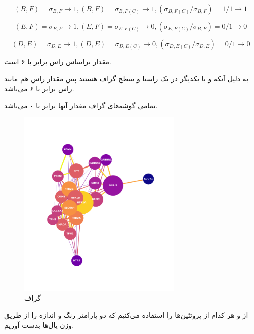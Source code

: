 \documentclass[10pt, a4paper]{article}
\begin{document}
\begin{equation}
(B,F) = \sigma_{B,F} \rightarrow 1, (B,F) = \sigma_{B,F(C)} \rightarrow 1, (\sigma_{B,F(C)}/\sigma_{B,F}) = 1/1 \rightarrow 1
\end{equation}

\begin{equation}
(E,F) = \sigma_{E,F} \rightarrow 1, (E,F) = \sigma_{E,F(C)} \rightarrow 0, (\sigma_{E,F(C)}/\sigma_{B,F}) = 0/1 \rightarrow 0
\end{equation}

\begin{equation}
(D,E) = \sigma_{D,E} \rightarrow 1, (D,E) = \sigma_{D,E(C)} \rightarrow 0, (\sigma_{D,E(C)}/\sigma_{D,E}) = 0/1 \rightarrow 0
\end{equation}

مقدار  براساس راس  برابر با ۶ است.

به دلیل آنکه  و  با یکدیگر در یک راستا و سطح گراف هستند پس مقدار راس
 هم مانند راس  برابر با ۶ می‌باشد.

تمامی گوشه‌های گراف مقدار  آنها برابر با ۰ می‌باشد.

\begin{figure}[H]
    \centering
    \includegraphics[width=0.7\textwidth]{images/betweenness_centrality_false.png}
    \caption{گراف }
    \label{fig: bc_mst_off}
\end{figure}

از  و  هر کدام از پروتئین‌ها را استفاده می‌کنیم که دو پارامتر
رنگ و اندازه را از طریق وزن یال‌ها بدست آوریم.
\end{document}
